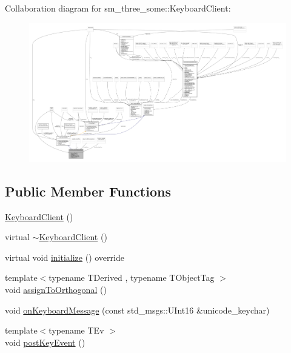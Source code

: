 Collaboration diagram for sm\+\_\+three\+\_\+some\+:\+:Keyboard\+Client\+:
\nopagebreak
\begin{figure}[H]
\begin{center}
\leavevmode
\includegraphics[width=350pt]{classsm__three__some_1_1KeyboardClient__coll__graph}
\end{center}
\end{figure}
\subsection*{Public Member Functions}
\begin{DoxyCompactItemize}
\item 
\hyperlink{classsm__three__some_1_1KeyboardClient_a8f7227b0fc8f987406ad9b3e56c6294e}{Keyboard\+Client} ()
\item 
virtual \hyperlink{classsm__three__some_1_1KeyboardClient_a0c0459f1037f4e4a99bd8bb1f4ea291b}{$\sim$\+Keyboard\+Client} ()
\item 
virtual void \hyperlink{classsm__three__some_1_1KeyboardClient_a8a74266ba37df7f09518b9689ddee828}{initialize} () override
\item 
{\footnotesize template$<$typename T\+Derived , typename T\+Object\+Tag $>$ }\\void \hyperlink{classsm__three__some_1_1KeyboardClient_a234d437e929ddfe30e028b7a8e22ea25}{assign\+To\+Orthogonal} ()
\item 
void \hyperlink{classsm__three__some_1_1KeyboardClient_ad793e68532acd85b1e1fd17c8df827e5}{on\+Keyboard\+Message} (const std\+\_\+msgs\+::\+U\+Int16 \&unicode\+\_\+keychar)
\item 
{\footnotesize template$<$typename T\+Ev $>$ }\\void \hyperlink{classsm__three__some_1_1KeyboardClient_a3b2305afa101b892e57d40a3ca99648f}{post\+Key\+Event} ()
\end{DoxyCompactItemize}
